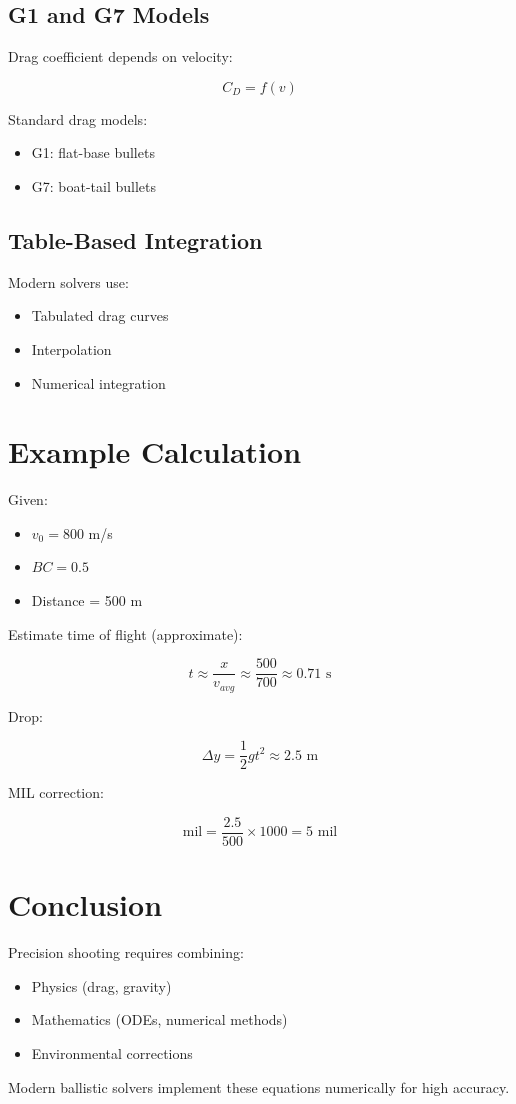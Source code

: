 \documentclass[11pt]{article}
\begin{document}
	\subsection{G1 and G7 Models}
	
	Drag coefficient depends on velocity:
	
	\[
	C_D = f(v)
	\]
	
	Standard drag models:
	\begin{itemize}
		\item G1: flat-base bullets
		\item G7: boat-tail bullets
	\end{itemize}
	
	\subsection{Table-Based Integration}
	
	Modern solvers use:
	\begin{itemize}
		\item Tabulated drag curves
		\item Interpolation
		\item Numerical integration
	\end{itemize}
	
	\section{Example Calculation}
	
	Given:
	\begin{itemize}
		\item $v_0 = 800$ m/s
		\item $BC = 0.5$
		\item Distance = 500 m
	\end{itemize}
	
	Estimate time of flight (approximate):
	
	\[
	t \approx \frac{x}{v_{avg}} \approx \frac{500}{700} \approx 0.71 \text{ s}
	\]
	
	Drop:
	
	\[
	\Delta y = \frac{1}{2} g t^2 \approx 2.5 \text{ m}
	\]
	
	MIL correction:
	
	\[
	\text{mil} = \frac{2.5}{500} \times 1000 = 5 \text{ mil}
	\]
	
	\section{Conclusion}
	
	Precision shooting requires combining:
	\begin{itemize}
		\item Physics (drag, gravity)
		\item Mathematics (ODEs, numerical methods)
		\item Environmental corrections
	\end{itemize}
	
	Modern ballistic solvers implement these equations numerically for high accuracy.
	
\end{document}
